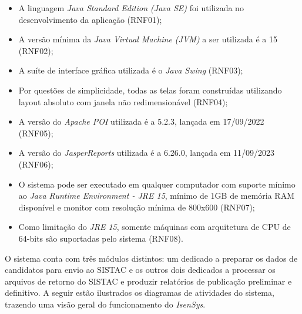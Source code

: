 \documentclass[
	12pt,			%
	openright,		%
	oneside,	
	a4paper,		%
	english,		%
	brazil			%
]{abntex2/abntex2}  %
\begin{document}
		\begin{itemize}
			
			\item A linguagem \textit{Java Standard Edition (Java SE)} foi utilizada no desenvolvimento da aplicação (RNF01);
			\item A versão mínima da \textit{Java Virtual Machine (JVM)} a ser utilizada é a 15 (RNF02);
			\item A suíte de interface gráfica utilizada é o \textit{Java Swing} (RNF03);
			\item Por questões de simplicidade, todas as telas foram construídas utilizando layout absoluto com janela não redimensionável (RNF04);
			\item A versão do \textit{Apache POI} utilizada é a 5.2.3, lançada em 17/09/2022 (RNF05);
			\item A versão do \textit{JasperReports\textregistered} utilizada é a 6.26.0, lançada em 11/09/2023 (RNF06);
			\item O sistema pode ser executado em qualquer computador com suporte mínimo ao \textit{Java Runtime Environment - JRE 15}, mínimo de 1GB de memória RAM disponível e monitor com resolução mínima de 800x600 (RNF07);
			\item Como limitação do \textit{JRE 15}, somente máquinas com arquitetura de CPU de 64-bits são suportadas pelo sistema (RNF08).
			
		\end{itemize}
	
		O sistema conta com três módulos distintos: um dedicado a preparar os dados de candidatos para envio ao SISTAC e os outros dois dedicados a processar os arquivos de retorno do SISTAC e produzir relatórios de publicação preliminar e definitivo. A seguir estão ilustrados os diagramas de atividades do sistema, trazendo uma visão geral do funcionamento do \textit{IsenSys}.
		
\end{document}
